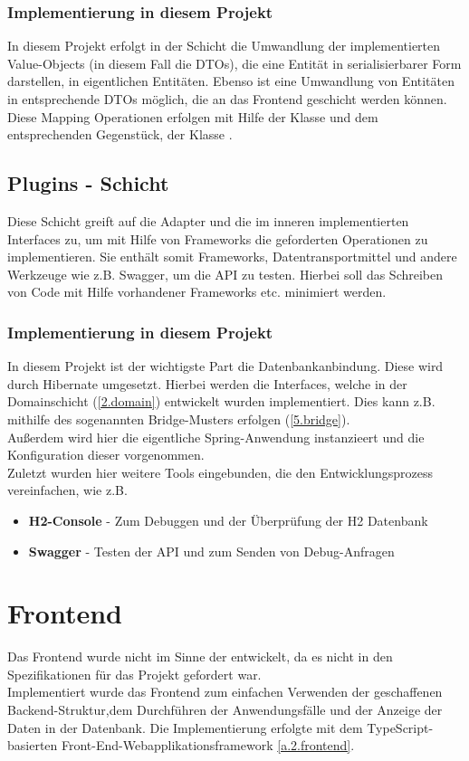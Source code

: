			\subsubsection{Implementierung in diesem Projekt}
			In diesem Projekt erfolgt in der Schicht die Umwandlung der implementierten Value-Objects (in diesem Fall die DTOs), die eine Entität in serialisierbarer Form darstellen, in eigentlichen Entitäten. Ebenso ist eine Umwandlung von Entitäten in entsprechende DTOs möglich, die an das Frontend geschicht werden können. \\
			Diese Mapping Operationen erfolgen mit Hilfe der Klasse  und dem entsprechenden Gegenstück, der Klasse .
		
		\subsection{Plugins - Schicht}	
		Diese Schicht greift auf die Adapter und die im inneren implementierten Interfaces zu, um mit Hilfe von Frameworks die geforderten Operationen zu implementieren. Sie enthält somit Frameworks, Datentransportmittel und andere Werkzeuge wie z.B. Swagger, um die API zu testen. Hierbei soll das Schreiben von Code mit Hilfe vorhandener Frameworks etc. minimiert werden.
			\subsubsection{Implementierung in diesem Projekt}
			In diesem Projekt ist der wichtigste Part die Datenbankanbindung. Diese wird durch Hibernate umgesetzt. Hierbei werden die Interfaces, welche in der Domainschicht (\cref{2.domain}) entwickelt wurden implementiert. Dies kann z.B. mithilfe des sogenannten Bridge-Musters erfolgen (\cref{5.bridge}). \\
			Außerdem wird hier die eigentliche Spring-Anwendung instanzieert und die Konfiguration dieser vorgenommen. \\
			Zuletzt wurden hier weitere Tools eingebunden, die den Entwicklungsprozess vereinfachen, wie z.B.
			\begin{itemize}
				\item \textbf{H2-Console} - Zum Debuggen und der Überprüfung der H2 Datenbank
				\item \textbf{Swagger} - Testen der API und zum Senden von Debug-Anfragen
			\end{itemize}
		
	\section{Frontend}
	Das Frontend wurde nicht im Sinne der  entwickelt, da es nicht in den Spezifikationen für das Projekt gefordert war. \\
	Implementiert wurde das Frontend zum einfachen Verwenden der geschaffenen Backend-Struktur,dem Durchführen der Anwendungsfälle und der Anzeige der Daten in der Datenbank. Die Implementierung erfolgte mit dem TypeScript-basierten Front-End-Webapplikationsframework  \cite{angular.angular} \cref{a.2.frontend}.
			
	
	